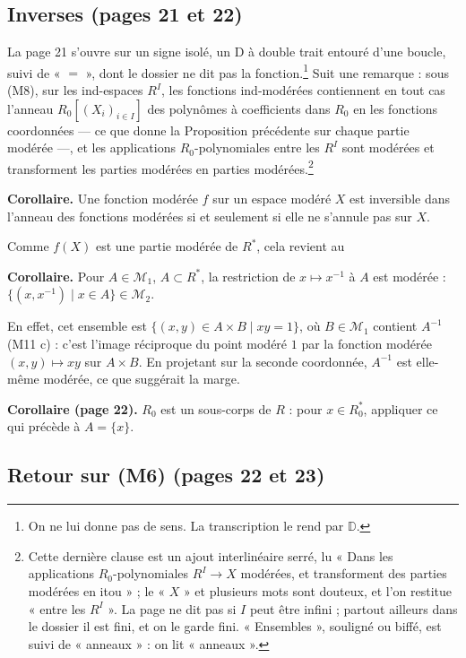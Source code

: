 \documentclass[11pt,a4paper]{article}
\begin{document}
\subsection*{Inverses (pages 21 et 22)}

La page 21 s'ouvre sur un signe isolé, un D à double trait entouré d'une
boucle, suivi de « $=$ », dont le dossier ne dit pas la fonction.\footnote{On
ne lui donne pas de sens. La transcription le rend par $\mathbb{D}$.} Suit une
remarque : sous (M8), sur les ind-espaces $R^I$, les fonctions ind-modérées
contiennent en tout cas l'anneau $R_0[(X_i)_{i \in I}]$ des polynômes à
coefficients dans $R_0$ en les fonctions coordonnées — ce que donne la
Proposition précédente sur chaque partie modérée —, et les applications
$R_0$-polynomiales entre les $R^I$ sont modérées et transforment les parties
modérées en parties modérées.\footnote{Cette dernière clause est un ajout
interlinéaire serré, lu « Dans les applications $R_0$-polynomiales $R^I \to X$
modérées, et transforment des parties modérées en itou » ; le « $X$ » et
plusieurs mots sont douteux, et l'on restitue « entre les $R^I$ ». La page ne
dit pas si $I$ peut être infini ; partout ailleurs dans le dossier il est
fini, et on le garde fini. « Ensembles », souligné ou biffé, est suivi de
« anneaux » : on lit « anneaux ».}

\textbf{Corollaire.} Une fonction modérée $f$ sur un espace modéré $X$ est
inversible dans l'anneau des fonctions modérées si et seulement si elle ne
s'annule pas sur $X$.

Comme $f(X)$ est une partie modérée de $R^*$, cela revient au

\textbf{Corollaire.} Pour $A \in \mathcal{M}_1$, $A \subset R^*$, la restriction
de $x \mapsto x^{-1}$ à $A$ est modérée : $\{(x, x^{-1}) \mid x \in A\} \in
\mathcal{M}_2$.

En effet, cet ensemble est $\{(x, y) \in A \times B \mid xy = 1\}$, où $B \in
\mathcal{M}_1$ contient $A^{-1}$ (M11 c) : c'est l'image réciproque du point
modéré $1$ par la fonction modérée $(x,y) \mapsto xy$ sur $A \times B$. En
projetant sur la seconde coordonnée, $A^{-1}$ est elle-même modérée, ce que
suggérait la marge.

\textbf{Corollaire (page 22).} $R_0$ est un sous-corps de $R$ : pour $x \in
R_0^*$, appliquer ce qui précède à $A = \{x\}$.

\subsection*{Retour sur (M6) (pages 22 et 23)}
\end{document}
